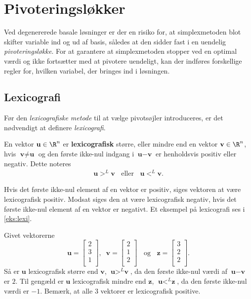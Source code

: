 \section{Pivoteringsløkker}
Ved degenererede basale løsninger er der en risiko for, at simplexmetoden blot skifter variable ind og ud af basis, således at den sidder fast i en uendelig \textit{pivoteringsløkke}.  
For at garantere at simplexmetoden stopper ved en optimal værdi og ikke fortsætter med at pivotere uendeligt, kan der indføres forskellige regler for, hvilken variabel, der bringes ind i løsningen.

\subsection{Lexicografi}
%
Før den \textit{lexicografiske metode} til at vælge pivotsøjler introduceres, er det nødvendigt at definere \textit{lexicografi}.
\begin{defn}{}{}
En vektor $\textbf{u}\in \R^n$ er \textbf{lexicografisk} større, eller mindre end en vektor $\textbf{v}\in \R^n$, hvis $\textbf{v} \neq \textbf{u}$ og den første ikke-nul indgang i $\textbf{u}-\textbf{v}$ er henholdsvis positiv eller negativ. Dette noteres
\begin{align*}
\textbf{u} >^L \textbf{v} \phantom{..} \text{ eller }\phantom{..} \textbf{u} <^L \textbf{v}.
\end{align*} 
\end{defn}
\noindent
Hvis det første ikke-nul element af en vektor er positiv, siges vektoren at være lexicografisk positiv. Modsat siges den at være lexicografisk negativ, hvis det første ikke-nul element af en vektor er negativt. Et eksempel på lexicografi ses i \ref{eks:lexi}.
\\
%
\begin{eks}\label{eks:lexi}
Givet vektorerne
$$\textbf{u}=
\begin{bmatrix}
2\\
3\\
1\\
\end{bmatrix}
,\phantom{..}
\textbf{v}=
\begin{bmatrix}
2\\
1\\
2\\
\end{bmatrix}
\phantom{..}\text{ og }\phantom{..}
\textbf{z}=
\begin{bmatrix}
3\\
2\\
2\\
\end{bmatrix}
.$$
Så er $\textbf{u}$  lexicografisk større end $\textbf{v}$, $\textbf{u} >^L \textbf{v}$, da den første ikke-nul værdi af $\textbf{u}-\textbf{v}$ er $2$.
Til gengæld er $\textbf{u}$ lexicografisk mindre end $\textbf{z}$, $\textbf{u} <^L \textbf{z}$, da den første ikke-nul værdi er $-1$.
Bemærk, at alle $3$ vektorer er lexicografisk positive.
\end{eks}
